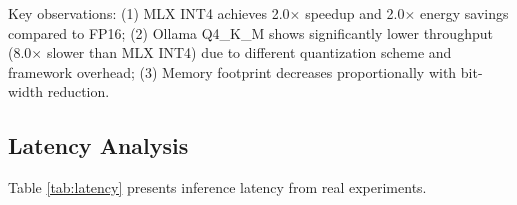 \documentclass[conference]{IEEEtran}
\begin{document}
\begin{table}[t]
\centering
\caption{Quantization method comparison for Qwen3.5-0.8B on Apple Silicon M4 Pro (100 tokens).}
\label{tab:quant_comparison}
\end{table}

Key observations: (1) MLX INT4 achieves 2.0$\times$ speedup and 2.0$\times$ energy savings compared to FP16; (2) Ollama Q4\_K\_M shows significantly lower throughput (8.0$\times$ slower than MLX INT4) due to different quantization scheme and framework overhead; (3) Memory footprint decreases proportionally with bit-width reduction.

\subsection{Latency Analysis}

Table \ref{tab:latency} presents inference latency from real experiments.

\begin{table}[t]
\centering
\caption{MLX quantization comparison on Apple Silicon M4 Pro (100 tokens).}
\label{tab:latency}
\end{table}
\end{document}
